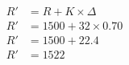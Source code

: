 \documentclass[preview]{standalone}
\begin{document}
\begin{align*}
R' &= R + K \times \Delta \\ R' &= 1500 + 32 \times 0.70 \\ R' &= 1500 + 22.4 \\ R' &= 1522
\end{align*}
\end{document}

